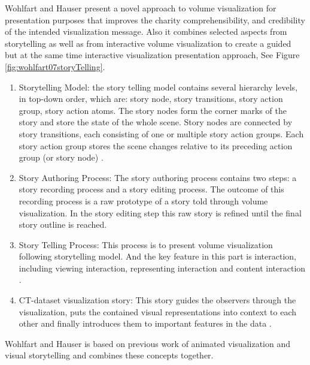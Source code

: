 \documentclass{egpubl}
\begin{document}
Wohlfart and Hauser present a novel approach to volume visualization for presentation purposes that improves the charity
comprehensibility, and credibility of the intended visualization message. Also it combines selected aspects from storytelling as well as from interactive volume visualization to create a guided but at the same time interactive visualization presentation approach, See Figure \ref{fig:wohlfart07storyTelling}\cite{wohlfart2}.
\begin{enumerate}
\item Storytelling Model: the story telling model contains  several hierarchy levels, in top-down order, which are: story node, story transitions, story action group, story action atoms. The story nodes form the corner marks of the story and store the state of the whole scene. Story nodes are connected by story transitions, each consisting of one or multiple story action groups. Each story action group stores the scene changes relative to its preceding action group (or story node) \cite{wohlfart2}.

\item Story Authoring Process: The story authoring process contains two steps: a story recording process and a story editing process. The outcome of this recording process is a raw prototype of a story told through volume visualization. In the story editing step this raw story is refined until the final story outline is reached.\cite{wohlfart2}
\item Story Telling Process: This process is to present volume visualization following storytelling model. And the key feature in this part is interaction, including viewing interaction, representing interaction and content interaction \cite{wohlfart2}.	
\item CT-dataset visualization story: This story guides the observers through the visualization, puts the contained visual representations
into context to each other and finally introduces them to important features in the data \cite{wohlfart2}.

\end{enumerate}
Wohlfart and Hauser is based on previous work of animated visualization \cite{iserhardt} and visual storytelling \cite{tiede} and combines these concepts together.
\end{document}
